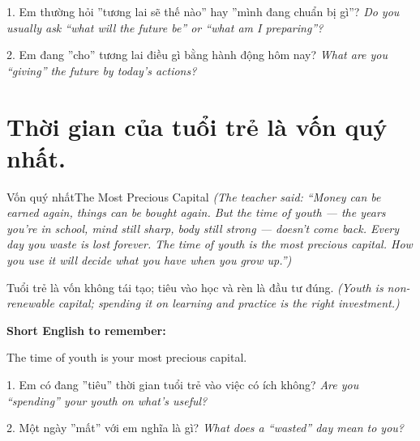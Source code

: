 \begin{tuhocnhanh}
1. Em thường hỏi ''tương lai sẽ thế nào'' hay ''mình đang chuẩn bị gì''? \textit{Do you usually ask ``what will the future be'' or ``what am I preparing''?}

2. Em đang ''cho'' tương lai điều gì bằng hành động hôm nay? \textit{What are you ``giving'' the future by today's actions?}
\end{tuhocnhanh}
\ngancach

\section{Thời gian của tuổi trẻ là vốn quý nhất.}
\begin{truyen}{Vốn quý nhất}{The Most Precious Capital}
\textit{(The teacher said: ``Money can be earned again, things can be bought again. But the time of youth — the years you're in school, mind still sharp, body still strong — doesn't come back. Every day you waste is lost forever. The time of youth is the most precious capital. How you use it will decide what you have when you grow up.'')}
\end{truyen}

\begin{baihoc}
Tuổi trẻ là vốn không tái tạo; tiêu vào học và rèn là đầu tư đúng.
\textit{(Youth is non-renewable capital; spending it on learning and practice is the right investment.)}
\end{baihoc}

\begin{ghinhoanh}
\textbf{Short English to remember:}

The time of youth is your most precious capital.

\end{ghinhoanh}

\begin{tuhocnhanh}
1. Em có đang ''tiêu'' thời gian tuổi trẻ vào việc có ích không? \textit{Are you ``spending'' your youth on what's useful?}

2. Một ngày ''mất'' với em nghĩa là gì? \textit{What does a ``wasted'' day mean to you?}
\end{tuhocnhanh}
\ngancach

